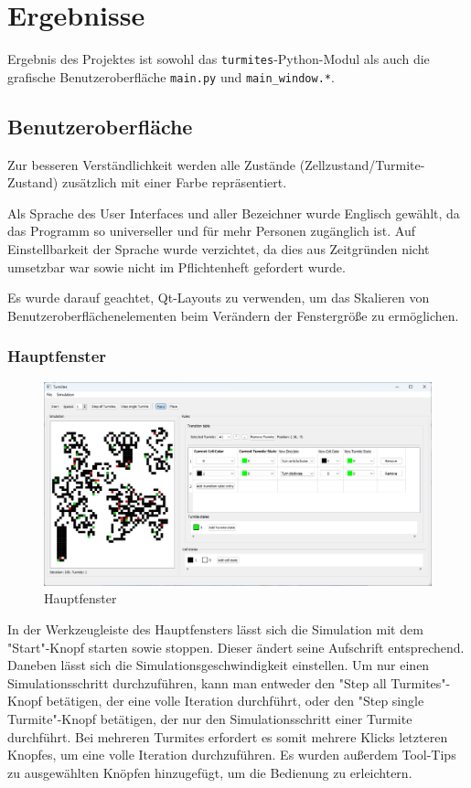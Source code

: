 \section{Ergebnisse}
Ergebnis des Projektes ist sowohl das \texttt{turmites}-Python-Modul als auch die grafische Benutzeroberfläche \texttt{main.py} und \texttt{main\_window.*}.

\subsection{Benutzeroberfläche}
Zur besseren Verständlichkeit werden alle Zustände (Zellzustand/Turmite-Zustand) zusätzlich mit einer Farbe repräsentiert. 

Als Sprache des User Interfaces und aller Bezeichner wurde Englisch gewählt, da das Programm so universeller und für mehr Personen zugänglich ist. Auf Einstellbarkeit der Sprache wurde verzichtet, da dies aus Zeitgründen nicht umsetzbar war sowie nicht im Pflichtenheft \cite{pflichtenheft} gefordert wurde.

Es wurde darauf geachtet, Qt-Layouts zu verwenden, um das Skalieren von Benutzeroberflächenelementen beim Verändern der Fenstergröße zu ermöglichen.

\subsubsection{Hauptfenster}

\begin{figure}[!htb]
    \includegraphics[width=\textwidth]{main_window.png}
    \caption{Hauptfenster}
\end{figure}

In der Werkzeugleiste des Hauptfensters lässt sich die Simulation mit dem "Start"-Knopf starten sowie stoppen. Dieser ändert seine Aufschrift entsprechend. Daneben lässt sich die Simulationsgeschwindigkeit einstellen. Um nur einen Simulationsschritt durchzuführen, kann man entweder den "Step all Turmites"-Knopf betätigen, der eine volle Iteration durchführt, oder den "Step single Turmite"-Knopf betätigen, der nur den Simulationsschritt einer Turmite durchführt. Bei mehreren Turmites erfordert es somit mehrere Klicks letzteren Knopfes, um eine volle Iteration durchzuführen. Es wurden außerdem Tool-Tips zu ausgewählten Knöpfen hinzugefügt, um die Bedienung zu erleichtern.

